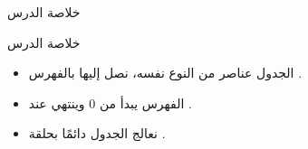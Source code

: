 \documentclass[aspectratio=169, 11pt, t, xcolor={table}]{beamer}
\begin{document}
\begin{frame}{خلاصة الدرس}
    \begin{tbox}{\faCheckCircle\quad خلاصة الدرس}
        \begin{itemize}
            \item الجدول عناصر من النوع نفسه، نصل إليها بالفهرس .
            \item الفهرس يبدأ من \textenglish{0} وينتهي عند .
            \item نعالج الجدول دائمًا بحلقة .
        \end{itemize}
    \end{tbox}
\end{frame}
\end{document}

